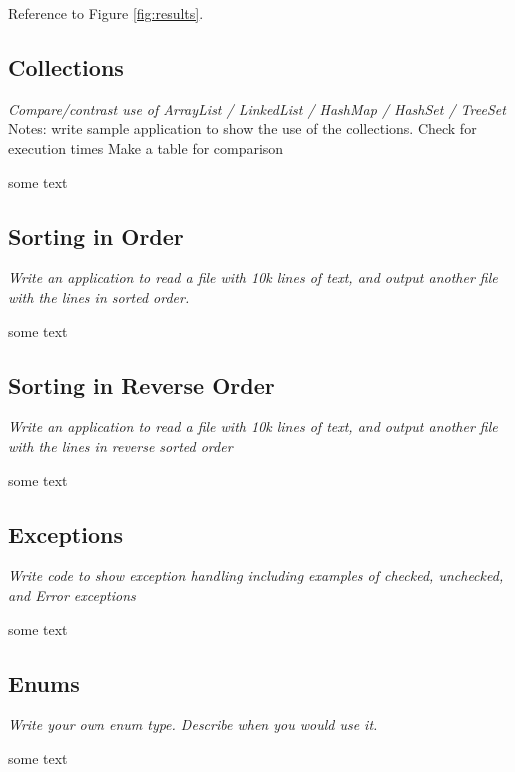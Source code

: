 Reference to Figure \ref{fig:results}.


\subsection{Collections}
\textit{Compare/contrast use of ArrayList / LinkedList / HashMap / HashSet / TreeSet}
Notes: write sample application to show the use of the collections. Check for execution times
Make a table for comparison

some text

\subsection{Sorting in Order}
\textit{Write an application to read a file with 10k lines of text, and output another file with the lines in sorted order.}

some text

\subsection{Sorting in Reverse Order}
\textit{Write an application to read a file with 10k lines of text, and output another file with the lines in reverse sorted order}

some text


\subsection{Exceptions}
\textit{Write code to show exception handling including examples of checked, unchecked, and Error exceptions}

some text

\subsection{Enums}
\textit{Write your own enum type.  Describe when you would use it.}

some text
